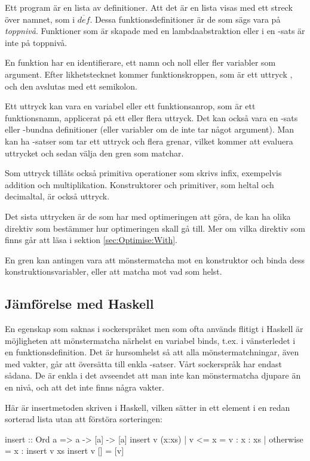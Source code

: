 \documentclass[Rapport]{subfiles}
\begin{document}
Ett program är en lista av definitioner. Att det är en lista visas med ett
streck över namnet, som i $\overline{def}$.
Dessa funktionsdefinitioner är de som sägs vara på \emph{toppnivå}. Funktioner som är 
skapade med en lambdaabstraktion eller i en -sats är inte på toppnivå. 

En funktion har en identifierare, ett namn och noll eller fler variabler som argument. Efter likhetstecknet
kommer funktionskroppen, som är ett uttryck , och den avslutas med
ett semikolon.

    Ett uttryck kan vara en variabel eller ett funktionsanrop, som är ett
funktionsnamn, applicerat på ett eller flera uttryck. Det kan också vara en -sats eller
-bundna definitioner (eller variabler om de inte tar något argument).
Man kan ha -satser som tar ett uttryck och flera grenar, vilket kommer
att evaluera uttrycket och sedan välja den gren som matchar.

Som uttryck tillåts också primitiva operationer som skrivs infix, exempelvis addition 
och multiplikation. Konstruktorer och primitiver, som heltal och decimaltal, är också uttryck.

Det sista uttrycken är de som har med optimeringen att göra, de kan ha olika direktiv
som bestämmer hur optimeringen skall gå till. Mer om vilka direktiv som finns går
att läsa i sektion \ref{sec:Optimise:With}.

    En gren kan antingen vara att mönstermatcha mot en konstruktor och binda
dess konstruktionsvariabler, eller att matcha mot vad som helst.

\subsection{Jämförelse med Haskell}

    En egenskap som saknas i sockerspråket men som ofta används flitigt i Haskell är 
möjligheten att mönstermatcha närhelst en variabel binds, t.ex. i vänsterledet
i en funktionsdefinition. Det är hursomhelst så att alla mönstermatchningar,
även med vakter, går att översätta till enkla -satser. Vårt sockerspråk
har endast sådana. De är enkla i det avseendet att man inte kan mönstermatcha djupare
än en nivå, och att det inte finns några vakter.

Här är insertmetoden skriven i Haskell, vilken sätter in ett element i en redan sorterad
lista utan att förstöra sorteringen:

\begin{codeEx}
  insert :: Ord a => a -> [a] -> [a]
  insert v (x:xs) 
      | v <= x    = v : x : xs
      | otherwise = x : insert v xs 
  insert v [] = [v]
\end{codeEx}                  
\end{document}
